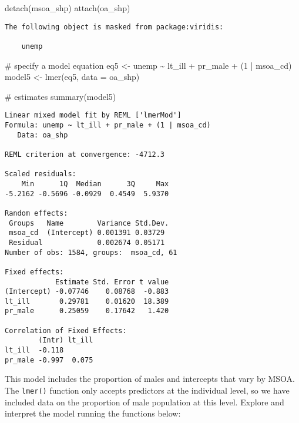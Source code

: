 \documentclass[
  letterpaper,
  krantz2]{style/krantz}
\newenvironment{Shaded}{\begin{snugshade}}{\end{snugshade}}
\newcommand{\AttributeTok}[1]{\textcolor[rgb]{0.40,0.45,0.13}{#1}}
\newcommand{\CommentTok}[1]{\textcolor[rgb]{0.37,0.37,0.37}{#1}}
\newcommand{\DecValTok}[1]{\textcolor[rgb]{0.68,0.00,0.00}{#1}}
\newcommand{\FunctionTok}[1]{\textcolor[rgb]{0.28,0.35,0.67}{#1}}
\newcommand{\NormalTok}[1]{\textcolor[rgb]{0.00,0.23,0.31}{#1}}
\newcommand{\OtherTok}[1]{\textcolor[rgb]{0.00,0.23,0.31}{#1}}
\newcommand{\SpecialCharTok}[1]{\textcolor[rgb]{0.37,0.37,0.37}{#1}}
\begin{document}
\begin{Shaded}
\begin{Highlighting}[]
\FunctionTok{detach}\NormalTok{(msoa\_shp)}
\FunctionTok{attach}\NormalTok{(oa\_shp)}
\end{Highlighting}
\end{Shaded}

\begin{verbatim}
The following object is masked from package:viridis:

    unemp
\end{verbatim}

\begin{Shaded}
\begin{Highlighting}[]
\CommentTok{\# specify a model equation}
\NormalTok{eq5 }\OtherTok{\textless{}{-}}\NormalTok{ unemp }\SpecialCharTok{\textasciitilde{}}\NormalTok{ lt\_ill }\SpecialCharTok{+}\NormalTok{ pr\_male }\SpecialCharTok{+}\NormalTok{ (}\DecValTok{1} \SpecialCharTok{|}\NormalTok{ msoa\_cd)}
\NormalTok{model5 }\OtherTok{\textless{}{-}} \FunctionTok{lmer}\NormalTok{(eq5, }\AttributeTok{data =}\NormalTok{ oa\_shp)}

\CommentTok{\# estimates}
\FunctionTok{summary}\NormalTok{(model5)}
\end{Highlighting}
\end{Shaded}

\begin{verbatim}
Linear mixed model fit by REML ['lmerMod']
Formula: unemp ~ lt_ill + pr_male + (1 | msoa_cd)
   Data: oa_shp

REML criterion at convergence: -4712.3

Scaled residuals: 
    Min      1Q  Median      3Q     Max 
-5.2162 -0.5696 -0.0929  0.4549  5.9370 

Random effects:
 Groups   Name        Variance Std.Dev.
 msoa_cd  (Intercept) 0.001391 0.03729 
 Residual             0.002674 0.05171 
Number of obs: 1584, groups:  msoa_cd, 61

Fixed effects:
            Estimate Std. Error t value
(Intercept) -0.07746    0.08768  -0.883
lt_ill       0.29781    0.01620  18.389
pr_male      0.25059    0.17642   1.420

Correlation of Fixed Effects:
        (Intr) lt_ill
lt_ill  -0.118       
pr_male -0.997  0.075
\end{verbatim}

This model includes the proportion of males and intercepts that vary by
MSOA. The \texttt{lmer()} function only accepts predictors at the
individual level, so we have included data on the proportion of male
population at this level. Explore and interpret the model running the
functions below:
\end{document}
